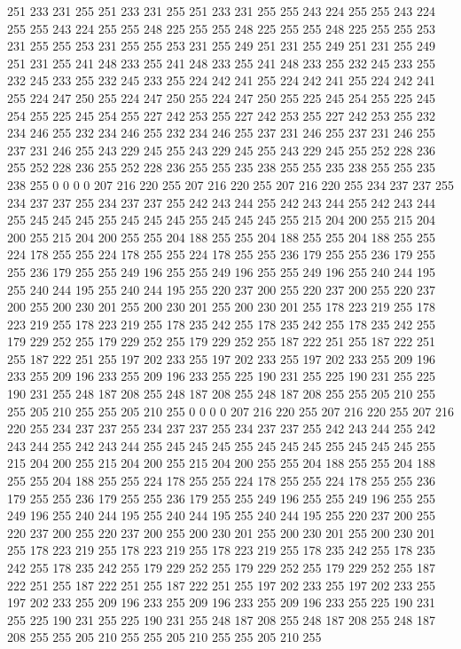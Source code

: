 251 233 231 255 251 233 231 255 251 233 231 255 255 243 224 255 255 243 224 255 255 243 224 255 255 248 225 255 255 248 225 255 255 248 225 255 255 253 231 255 255 253 231 255 255 253 231 255 249 251 231 255 249 251 231 255 249 251 231 255 241 248 233 255
241 248 233 255 241 248 233 255 232 245 233 255 232 245 233 255 232 245 233 255 224 242 241 255 224 242 241 255 224 242 241 255 224 247 250 255 224 247 250 255 224 247 250 255 225 245 254 255 225 245 254 255 225 245 254 255 227 242 253 255 227 242 253 255
227 242 253 255 232 234 246 255 232 234 246 255 232 234 246 255 237 231 246 255 237 231 246 255 237 231 246 255 243 229 245 255 243 229 245 255 243 229 245 255 252 228 236 255 252 228 236 255 252 228 236 255 255 235 238 255 255 235 238 255 255 235 238 255
0 0 0 0 207 216 220 255 207 216 220 255 207 216 220 255 234 237 237 255 234 237 237 255 234 237 237 255 242 243 244 255 242 243 244 255 242 243 244 255 245 245 245 255 245 245 245 255 245 245 245 255 215 204 200 255 215 204 200 255 215 204 200 255
255 204 188 255 255 204 188 255 255 204 188 255 255 224 178 255 255 224 178 255 255 224 178 255 255 236 179 255 255 236 179 255 255 236 179 255 255 249 196 255 255 249 196 255 255 249 196 255 240 244 195 255 240 244 195 255 240 244 195 255 220 237 200 255
220 237 200 255 220 237 200 255 200 230 201 255 200 230 201 255 200 230 201 255 178 223 219 255 178 223 219 255 178 223 219 255 178 235 242 255 178 235 242 255 178 235 242 255 179 229 252 255 179 229 252 255 179 229 252 255 187 222 251 255 187 222 251 255
187 222 251 255 197 202 233 255 197 202 233 255 197 202 233 255 209 196 233 255 209 196 233 255 209 196 233 255 225 190 231 255 225 190 231 255 225 190 231 255 248 187 208 255 248 187 208 255 248 187 208 255 255 205 210 255 255 205 210 255 255 205 210 255
0 0 0 0 207 216 220 255 207 216 220 255 207 216 220 255 234 237 237 255 234 237 237 255 234 237 237 255 242 243 244 255 242 243 244 255 242 243 244 255 245 245 245 255 245 245 245 255 245 245 245 255 215 204 200 255 215 204 200 255 215 204 200 255
255 204 188 255 255 204 188 255 255 204 188 255 255 224 178 255 255 224 178 255 255 224 178 255 255 236 179 255 255 236 179 255 255 236 179 255 255 249 196 255 255 249 196 255 255 249 196 255 240 244 195 255 240 244 195 255 240 244 195 255 220 237 200 255
220 237 200 255 220 237 200 255 200 230 201 255 200 230 201 255 200 230 201 255 178 223 219 255 178 223 219 255 178 223 219 255 178 235 242 255 178 235 242 255 178 235 242 255 179 229 252 255 179 229 252 255 179 229 252 255 187 222 251 255 187 222 251 255
187 222 251 255 197 202 233 255 197 202 233 255 197 202 233 255 209 196 233 255 209 196 233 255 209 196 233 255 225 190 231 255 225 190 231 255 225 190 231 255 248 187 208 255 248 187 208 255 248 187 208 255 255 205 210 255 255 205 210 255 255 205 210 255

